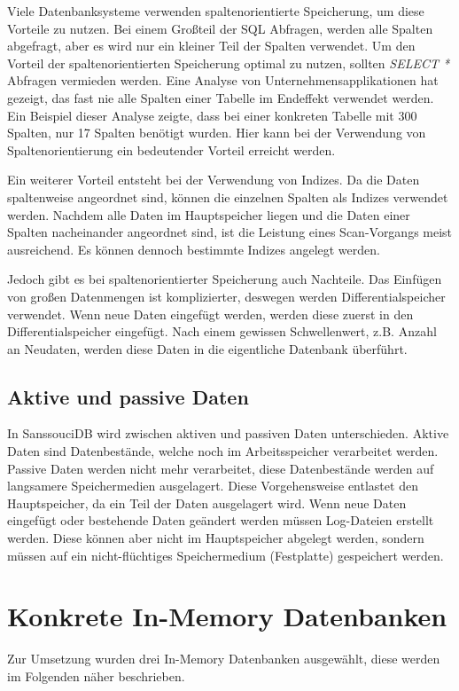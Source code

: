 \documentclass[draft,final]{vutinfth} %
\begin{document}
Viele Datenbanksysteme verwenden spaltenorientierte Speicherung, um diese Vorteile zu nutzen. Bei einem Gro{\ss}teil der SQL Abfragen, werden alle Spalten abgefragt, aber es wird nur ein kleiner Teil der Spalten verwendet. Um den Vorteil der spaltenorientierten Speicherung optimal zu nutzen, sollten \textit{SELECT *} Abfragen vermieden werden. Eine Analyse von Unternehmensapplikationen hat gezeigt, das fast nie alle Spalten einer Tabelle im Endeffekt verwendet werden. Ein Beispiel dieser Analyse zeigte, dass bei einer konkreten Tabelle mit 300 Spalten, nur 17 Spalten benötigt wurden. Hier kann bei der Verwendung von Spaltenorientierung ein bedeutender Vorteil erreicht werden.

Ein weiterer Vorteil entsteht bei der Verwendung von Indizes. Da die Daten spaltenweise angeordnet sind, können die einzelnen Spalten als Indizes verwendet werden. Nachdem alle Daten im Hauptspeicher liegen und die Daten einer Spalten nacheinander angeordnet sind, ist die Leistung eines Scan-Vorgangs meist ausreichend. Es können dennoch bestimmte Indizes angelegt werden.

Jedoch gibt es bei spaltenorientierter Speicherung auch Nachteile. Das Einfügen von gro\ss en Datenmengen ist komplizierter, deswegen werden Differentialspeicher verwendet. Wenn neue Daten eingefügt werden, werden diese zuerst in den Differentialspeicher eingefügt. Nach einem gewissen Schwellenwert, z.B. Anzahl an Neudaten, werden diese Daten in die eigentliche Datenbank überführt.


\subsection{Aktive und passive Daten}
In SanssouciDB wird zwischen aktiven und passiven Daten unterschieden. Aktive Daten sind Datenbestände, welche noch im Arbeitsspeicher verarbeitet werden. Passive Daten werden nicht mehr verarbeitet, diese Datenbestände werden auf langsamere Speichermedien ausgelagert. Diese Vorgehensweise entlastet den Hauptspeicher, da ein Teil der Daten ausgelagert wird. Wenn neue Daten eingefügt oder bestehende Daten geändert werden müssen Log-Dateien erstellt werden. Diese können aber nicht im Hauptspeicher abgelegt werden, sondern müssen auf ein nicht-flüchtiges Speichermedium (Festplatte) gespeichert werden.


\section{Konkrete In-Memory Datenbanken}
Zur Umsetzung wurden drei In-Memory Datenbanken ausgewählt, diese werden im Folgenden näher beschrieben.
\end{document}
